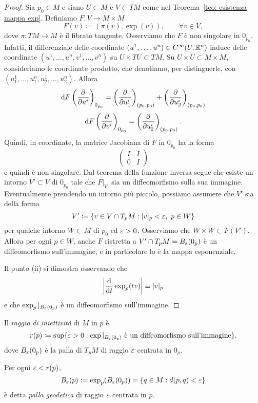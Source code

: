 	\begin{proof}
		Sia \(p_0 \in M\) e siano \(U \subset M\) e \(V \subset TM\) come nel Teorema~\ref{teo: esistenza mappa exp}. Definiamo \(F:V \to M \times M\)
		\[
		F(v) \coloneq (\pi(v),\exp(v)), \qquad \forall v \in V,
		\]
		dove \(\pi:TM \to M\) è il fibrato tangente. Osserviamo che \(F\) è non singolare in \(0_{p_0}\). Infatti, il differenziale delle coordinate \((u^1,\dots,u^n) \in C^\infty(U,\mathbb{R}^n)\) induce delle coordinate \((u^1,\dots,u^n,v^1,\dots,v^n)\) su \(U \times TU \subset TM\). Su \(U \times U \subset M \times M\), consideriamo le coordinate prodotto, che denotiamo, per distinguerle, con \((u_1^1,\dots,u_1^n,u_2^1,\dots,u_2^n)\). Allora
		\[
		\mathrm{d} F \left(\frac{\partial}{\partial u^i}\right)_{0_{p_0}} = \left(\frac{\partial}{\partial u_1^i}\right)_{(p_0,p_0)} + \left(\frac{\partial}{\partial u_2^i}\right)_{(p_0,p_0)}
		\]
		\[
		\mathrm{d} F \left( \frac{\partial}{\partial v^i} \right)_{0_{p_0}} = \left(\frac{\partial}{\partial u_2^i}\right)_{(p_0,p_0)}.
		\]
		Quindi, in coordinate, la matrice Jacobiana di \(F\) in \(0_{p_0}\) ha la forma
		\[\begin{pmatrix}
			I & I \\
			0 & I
		\end{pmatrix}\]
		e quindi è non singolare. Dal teorema della funzione inversa segue che esiste un intorno \(V'\subset V\) di \(0_{p_0}\) tale che \(F|_{V'}\) sia un diffeomorfismo sulla sua immagine. Eventualmente prendendo un intorno più piccolo, possiamo assumere che \(V'\) sia della forma 
		\[
		V' \coloneq \{v \in V \cap T_pM : |v|_p<\varepsilon, \ p \in W\}
		\]
		per qualche intorno \(W \subset M\) di \(p_0\) ed \(\varepsilon>0\). Osserviamo che \(W \times W \subset F(V')\). Allora per ogni \(p \in W\), anche \(F\) ristretta a \(V'\cap T_pM=B_\varepsilon(0_p)\) è un diffeomorfismo sull'immagine, e in particolare lo è la mappa esponenziale. 
		
		Il punto (ii) si dimostra osservando che 
		\[
		\left| \frac{\mathrm{d}}{\mathrm{d} t} \exp_p(tv) \right| \equiv |v|_p 
		\]
		e che \(\exp_p|_{B_\varepsilon(0_p)}\) è un diffeomorfismo sull'immagine. 
		
	\end{proof}
	
	\begin{defi}
		Il \textit{raggio di iniettività} di \(M\) in \(p\) è 
		\[
		r(p) \coloneq \sup\{\varepsilon>0 : \exp|_{B_\varepsilon(0_p)} \text{ è un diffeomorfismo sull'immagine}\}.
		\]
		dove \(B_\varepsilon(0_p)\) è la palla di \(T_pM\) di raggio \(\varepsilon\) centrata in \(0_p\). 
		
		Per ogni \(\varepsilon < r(p)\), 
		\[
		B_\varepsilon(p):=\exp_p(B_\varepsilon(0_p)) = \{ q \in M : d(p,q) < \varepsilon\}
		\]
		è detta \textit{palla geodetica} di raggio \(\varepsilon\) centrata in \(p\).
	\end{defi}
	
